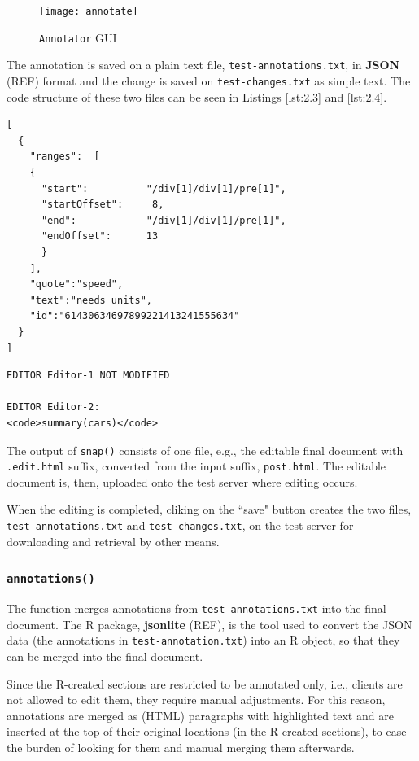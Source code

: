\documentclass[a4paper, 12pt]{report}
\begin{document}
\begin{figure}[h]
\texttt{[image: annotate]}
\caption{\texttt{Annotator} GUI}
\label{fig:2.4}
\end{figure}

The annotation is saved on a plain text file, \texttt{test-annotations.txt}, in \textbf{JSON} (REF) format and the change is saved on \texttt{test-changes.txt} as simple text. The code structure of these two files can be seen in Listings \ref{lst:2.3} and \ref{lst:2.4}.

\begin{lstlisting}[numbers=none, caption={\texttt{test-annotations.txt}}, label={lst:2.3}]
[
  {
    "ranges":  [
    {
      "start":          "/div[1]/div[1]/pre[1]",
      "startOffset":     8,
      "end":            "/div[1]/div[1]/pre[1]",
      "endOffset":      13
      }
    ],
    "quote":"speed",
    "text":"needs units",
    "id":"61430634697899221413241555634"
  }
]
\end{lstlisting}

\begin{lstlisting}[numbers=none, caption={\texttt{test-changes.txt}}, label={lst:2.4}]
EDITOR Editor-1 NOT MODIFIED

EDITOR Editor-2:
<code>summary(cars)</code>
\end{lstlisting}

The output of \texttt{snap()} consists of one file, e.g., the editable final document with \texttt{.edit.html} suffix, converted from the input suffix, \texttt{post.html}. The editable document is, then, uploaded onto the test server where editing occurs.

When the editing is completed, cliking on the ``save" button creates the two files, \texttt{test-annotations.txt} and \texttt{test-changes.txt}, on the test server for downloading and retrieval by other means.

\subsubsection*{\texttt{annotations()}}
The function merges annotations from \texttt{test-annotations.txt} into the final document. The R package, \textbf{jsonlite} (REF), is the tool used to convert the JSON data (the annotations in \texttt{test-annotation.txt}) into an R object, so that they can be merged into the final document.

Since the R-created sections are restricted to be annotated only, i.e., clients are not allowed to edit them, they require manual adjustments. For this reason, annotations are merged as (HTML) paragraphs with highlighted text and are inserted at the top of their original locations (in the R-created sections), to ease the burden of looking for them and manual merging them afterwards.
\end{document}
